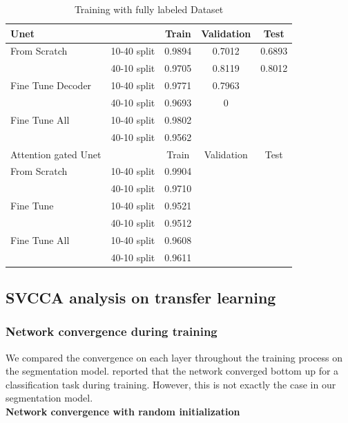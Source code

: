 \begin{table}[h]
	\centering
	\begin{tabular}{l  c c c c}
	\hline
	\hline
	Unet	&		&	Train	&	Validation	&	Test	\\
	\hline
	From Scratch	&	10-40 split	&	0.9894	&	0.7012	&	0.6893	\\
			&	40-10 split	&	0.9705	&	0.8119	&	0.8012	\\
	Fine Tune Decoder	&	10-40 split	&	0.9771	&	0.7963	&		\\
			&	40-10 split	&	0.9693	&	0	&		\\
	Fine Tune All	&	10-40 split	&	0.9802	&		&		\\
			&	40-10 split	&	0.9562	&		&		\\
	\hline
	\hline
	Attention gated Unet	&		&	Train	&	Validation	&	Test	\\
	\hline
	From Scratch	&	10-40 split	&	0.9904	&		&		\\
				&	40-10 split	&	0.9710	&		&		\\
	Fine Tune	&	10-40 split	&	0.9521	&		&		\\
				&	40-10 split	&	0.9512	&		&		\\
	Fine Tune All	&	10-40 split	&	0.9608	&		&		\\
				&	40-10 split	&	0.9611	&		&		\\	
	\hline
	\hline
	\end{tabular}
	\caption{Training with fully labeled Dataset}
	\label{tab:fully-label-result}
\end{table}
	


\subsection{SVCCA analysis on transfer learning}

\subsubsection{Network convergence during training}
We compared the convergence on each layer throughout the training process on the segmentation model. \cite{transfusion} reported that the network converged bottom up for a classification task during training. However, this is not exactly the case in our segmentation model.\\

\textbf{Network convergence with random initialization}\\

